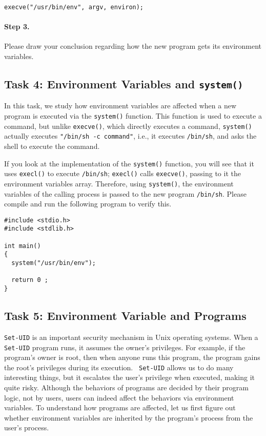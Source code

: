 \begin{lstlisting}
execve("/usr/bin/env", argv, environ);
\end{lstlisting}


\paragraph{Step 3.} Please draw your conclusion regarding how the new
program gets its environment variables. 



\subsection{Task 4: Environment Variables and {\tt system()}}

In this task, we study how environment variables are affected 
when a new program is executed via the {\tt system()} function. This 
function is used to execute a command, but unlike
{\tt execve()}, which directly executes a command, {\tt system()}
actually executes {\tt "/bin/sh -c command"}, i.e., it
executes {\tt /bin/sh}, and asks the shell to execute the command.

If you look at the implementation of the {\tt system()} function, you will
see that it uses {\tt execl()} to execute {\tt /bin/sh}; {\tt execl()}
calls {\tt execve()}, passing to it the environment variables array. 
Therefore, using {\tt system()},  the environment variables of the calling process 
is passed to the new program {\tt /bin/sh}. Please compile and run the following program
to verify this. 


\begin{lstlisting}
#include <stdio.h>
#include <stdlib.h>

int main()
{
  system("/usr/bin/env");

  return 0 ;
}
\end{lstlisting}



\subsection{Task 5: Environment Variable and \setuid Programs}

{\tt Set-UID} is an important security mechanism in Unix operating systems.
When a {\tt Set-UID} program runs, it assumes the owner's privileges. For
example, if the program's owner is root, then when anyone runs this
program, the program gains the root's privileges during its execution. {\tt
Set-UID} allows us to do many interesting things, but it escalates the
user's privilege when executed, making it quite risky. Although the
behaviors of \setuid programs are decided by their program logic, not by
users, users can indeed affect the behaviors via environment variables. 
To understand how \setuid programs are affected, let us first figure out
whether environment variables are inherited by the \setuid program's
process from the user's process.



